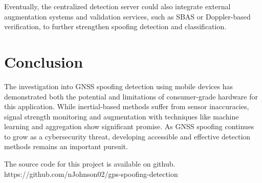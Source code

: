 \documentclass[conference]{IEEEtran}
\begin{document}
Eventually, the centralized detection server could also integrate external augmentation systems and validation services, such as SBAS or Doppler-based verification, to further strengthen spoofing detection and classification.


\section{Conclusion}
The investigation into GNSS spoofing detection using mobile devices has demonstrated both the potential and limitations of consumer-grade hardware for this application. While inertial-based methods suffer from sensor inaccuracies, signal strength monitoring and augmentation with techniques like machine learning and aggregation show significant promise. As GNSS spoofing continues to grow as a cybersecurity threat, developing accessible and effective detection methods remains an important pursuit.

The source code for this project is available on github.
https://github.com/nJohnson02/gps-spoofing-detection



\nocite{*}
\balance{}
\end{document}

